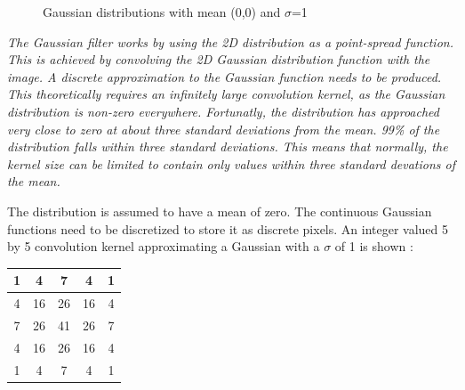\begin{figure}[H]
  \centering
  \hfill
  \caption{Gaussian distributions with mean (0,0) and $\sigma$=1\cite{GaussianBlur}}
\end{figure} 



\emph{\color{green}The Gaussian filter works by using the 2D distribution as a point-spread function. This is achieved by convolving the 2D Gaussian distribution function with the image. A discrete approximation to the Gaussian function needs to be produced. This theoretically requires an infinitely large convolution kernel, as the Gaussian distribution is non-zero everywhere. Fortunatly, the distribution has approached very close to zero at about three standard deviations from the mean. 99\% of the distribution falls within three standard deviations. This means that normally, the kernel size can be limited to contain only values within three standard devations of the mean.}

The distribution is assumed to have a mean of zero. The continuous Gaussian functions need to be discretized to store it as discrete pixels. An integer valued 5 by 5 convolution kernel approximating a Gaussian with a $ \sigma $ of 1 is shown : 




\begin{center}
\begin{tabular}{ | c | c | c | c | c |} \hline
  
  1 & 4  & 7  & 4  & 1  \\ \hline  
  4 & 16 & 26 & 16 & 4   \\ \hline  
  7 & 26 & 41 & 26 & 7   \\ \hline 
  4 & 16 & 26 & 16 & 4   \\ \hline 
  1 & 4  & 7  & 4  & 1  \\ \hline   
    
      \end{tabular}
  \label{tab:GaussianBlur}
\end{center}


